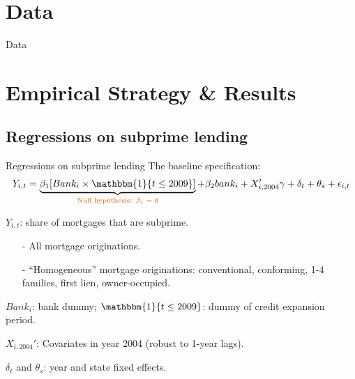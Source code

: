 \documentclass[notes,11pt, aspectratio=169]{beamer}
\newenvironment{wideitemize}{\itemize\addtolength{\itemsep}{10pt}}{\enditemize}  %
\begin{document}
\section{Data}

\begin{frame}{Data}
\end{frame}



\section{Empirical Strategy \& Results}

\subsection*{Regressions on subprime lending}

\begin{frame}{Regressions on subprime lending}
The baseline specification: 
\begin{equation*}
    Y_{i,t} = \underbrace{\beta_1 [ Bank_i \times \mathbbm{1}\{ t \leq 2009 \} ]}_{\text{\textcolor{red}{Null hypothesis: $\beta_1=0$}}} + \beta_2 bank_i + X_{i, 2004}' \gamma + \delta_t + \theta_s + \epsilon_{i,t}
\end{equation*}

\begin{wideitemize}
    \item <1-> $Y_{i,t}$: share of mortgages that are subprime. 
    \begin{itemize}
        \item [-] All mortgage originations.
        \item [-] ``Homogeneous'' mortgage originations: conventional, conforming, 1-4 families, first lien, owner-occupied.
    \end{itemize}
    
    \item <2-> $Bank_i$: bank dummy; $\mathbbm{1}\{ t \leq 2009 \}$: dummy of credit expansion period. 
    
    \item <3> $X_{i, 2004}'$: Covariates in year 2004 (robust to 1-year lags).
    
    \item <3> $\delta_t$ and $\theta_s$: year and state fixed effects.
\end{wideitemize}
\end{frame}
\end{document}
